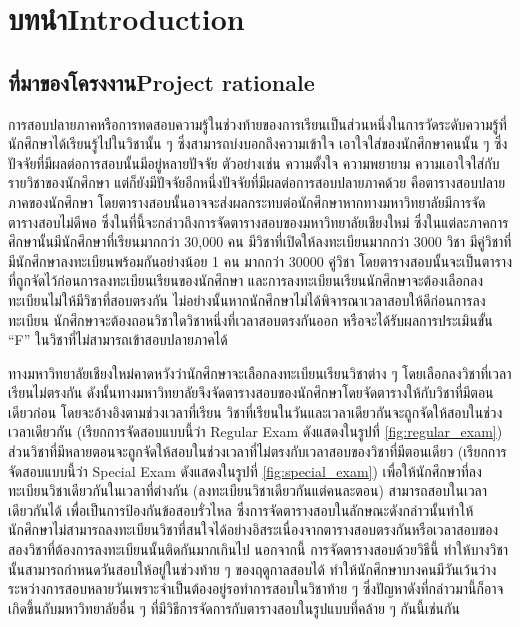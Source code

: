 \chapter{\ifcpe บทนำ\else Introduction\fi}

\section{\ifcpe ที่มาของโครงงาน\else Project rationale\fi}
\label{sec:project_rationale}


การสอบปลายภาคหรือการทดสอบความรู้ในช่วงท้ายของการเรียนเป็นส่วนหนึ่งในการวัดระดับความรู้ที่นักศึกษาได้เรียนรู้ไปในวิชานั้น ๆ 
ซึ่งสามารถบ่งบอกถึงความเข้าใจ เอาใจใส่ของนักศึกษาคนนั้น ๆ ซึ่งปัจจัยที่มีผลต่อการสอบนั้นมีอยู่หลายปัจจัย 
ตัวอย่างเช่น ความตั้งใจ ความพยายาม ความเอาใจใส่กับรายวิชาของนักศึกษา แต่ก็ยังมีปัจจัยอีกหนึ่งปัจจัยที่มีผลต่อการสอบปลายภาคด้วย 
คือตารางสอบปลายภาคของนักศึกษา โดยตารางสอบนั้นอาจจะส่งผลกระทบต่อนักศึกษาหากทางมหาวิทยาลัยมีการจัดตารางสอบไม่ดีพอ 
ซึ่งในที่นี้จะกล่าวถึงการจัดตารางสอบของมหาวิทยาลัยเชียงใหม่ ซึ่งในแต่ละภาคการศึกษานั้นมีนักศึกษาที่เรียนมากกว่า 30,000 คน 
มีวิชาที่เปิดให้ลงทะเบียนมากกว่า 3000 วิชา มีคู่วิชาที่มีนักศึกษาลงทะเบียนพร้อมกันอย่างน้อย 1 คน มากกว่า 30000 คู่วิชา 
โดยตารางสอบนั้นจะเป็นตารางที่ถูกจัดไว้ก่อนการลงทะเบียนเรียนของนักศึกษา และการลงทะเบียนเรียนนักศึกษาจะต้องเลือกลงทะเบียนไม่ให้มีวิชาที่สอบตรงกัน 
ไม่อย่างนั้นหากนักศึกษาไม่ได้พิจารณาเวลาสอบให้ดีก่อนการลงทะเบียน นักศึกษาจะต้องถอนวิชาใดวิชาหนึ่งที่เวลาสอบตรงกันออก หรือจะได้รับผลการประเมินขั้น “F” ในวิชาที่ไม่สามารถเข้าสอบปลายภาคได้


ทางมหาวิทยาลัยเชียงใหม่คาดหวังว่านักศึกษาจะเลือกลงทะเบียนเรียนวิชาต่าง ๆ โดยเลือกลงวิชาที่เวลาเรียนไม่ตรงกัน 
ดังนั้นทางมหาวิทยาลัยจึงจัดตารางสอบของนักศึกษาโดยจัดตารางให้กับวิชาที่มีตอนเดียวก่อน โดยจะอ้างอิงตามช่วงเวลาที่เรียน 
วิชาที่เรียนในวันและเวลาเดียวกันจะถูกจัดให้สอบในช่วงเวลาเดียวกัน (เรียกการจัดสอบแบบนี้ว่า Regular Exam ดังแสดงในรูปที่ \ref{fig:regular_exam}) 
ส่วนวิชาที่มีหลายตอนจะถูกจัดให้สอบในช่วงเวลาที่ไม่ตรงกับเวลาสอบของวิชาที่มีตอนเดียว  (เรียกการจัดสอบแบบนี้ว่า Special Exam ดังแสดงในรูปที่ \ref{fig:special_exam}) 
เพื่อให้นักศึกษาที่ลงทะเบียนวิชาเดียวกันในเวลาที่ต่างกัน  (ลงทะเบียนวิชาเดียวกันแต่คนละตอน) สามารถสอบในเวลาเดียวกันได้ เพื่อเป็นการป้องกันข้อสอบรั่วไหล 
ซึ่งการจัดตารางสอบในลักษณะดังกล่าวนั้นทําให้นักศึกษาไม่สามารถลงทะเบียนวิชาที่สนใจได้อย่างอิสระเนื่องจากตารางสอบตรงกันหรือเวลาสอบของสองวิชาที่ต้องการลงทะเบียนนั้นติดกันมากเกินไป นอกจากนี้ การจัดตารางสอบด้วยวิธีนี้ ทำให้บางวิชานั้นสามารถกําหนดวันสอบให้อยู่ในช่วงท้าย ๆ ของฤดูกาลสอบได้ 
ทําให้นักศึกษาบางคนมีวันเว้นว่างระหว่างการสอบหลายวันเพราะจําเป็นต้องอยู่รอทำการสอบในวิชาท้าย ๆ ซึ่งปัญหาดังที่กล่าวมานี้ก็อาจเกิดขึ้นกับมหาวิทยาลัยอื่น ๆ ที่มีวิธีการจัดการกับตารางสอบในรูปแบบที่คล้าย ๆ กันนี้เช่นกัน


